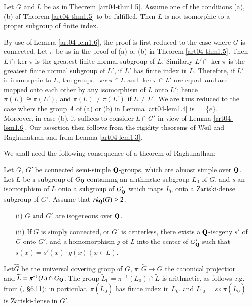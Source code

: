 \begin{proposition}\label{art04-prop1.7}
Let $G$ and $L$ be as in Theorem \ref{art04-thm1.5}. Assume one of the conditions (a), (b) of Theorem \ref{art04-thm1.5} to be fulfilled. Then $L$ is not isomorphic to a proper subgroup of finite index.
\end{proposition}

By use of Lemma \ref{art04-lem1.6}, the proof is first reduced to the case where $G$ is connected. Let $\pi$ be as in the proof of (a) or (b) in Theorem \ref{art04-thm1.5}. Then $L\cap \ker \pi$ is the greatest finite normal subgroup of $L$. Similarly $L'\cap \ker \pi$ is the greatest finite normal subgroup of $L'$, if $L'$ has finite index in $L$. Therefore, if $L'$ is isomorphic to $L$, the groups $\ker \pi \cap L$ and $\ker \pi \cap L'$ are equal, and are mapped onto each other by any isomorphism of $L$ onto $L'$; hence $\pi(L)\cong \pi(L')$, and $\pi(L)\neq \pi(L')$ if $L\neq L'$. We are thus reduced to the case where the group $A$ of (a) or (b) in Lemma \ref{art04-lem1.4} is $=\{e\}$. Moreover, in case (b), it suffices to consider $L\cap G'$ in view of Lemma \ref{art04-lem1.6}. Our assertion then follows from the rigidity theorems of Weil and Raghunathan and from Lemma \ref{art04-lem1.3}.

We shall need the following consequence of a theorem of Raghunathan:

\begin{lemma}\label{art04-lem1.8}
Let $G$, $G'$ be connected semi-simple $\mathbf{Q}$-groups, which are almost simple over $\mathbf{Q}$. Let $L$ be a subgroup of $G_{\mathbf{Q}}$ containing an arithmetic subgroup $L_{0}$ of $G$, and $s$ an isomorphism of $L$ onto a subgroup of $G'_{\mathbf{Q}}$ which maps $L_{0}$ onto a Zariski-dense subgroup of $G'$. Assume that $rk_{\mathbf{Q}}(G)\geq 2$.
\begin{itemize}
\item[{\rm(i)}] $G$ and $G'$ are isogeneous over $\mathbf{Q}$.

\item[{\rm(ii)}] If $G$ is simply connected, or $G'$ is centerless, there exists a $\mathbf{Q}$-isogeny $s'$ of $G$ onto $G'$, and a homomorphism $g$ of $L$ into the center of $G'_{\mathbf{Q}}$ such that $s(x)=s'(x)\cdot g(x)(x\in L)$.
\end{itemize}
\end{lemma}

Let\pageoriginale $\widehat{G}$ be the universal covering group of $G$, $\pi:\widetilde{G}\to G$ the canonical projection and $\widetilde{L}=\pi^{-1}(L)\cap G_{\mathbf{Q}}$. The group $\widetilde{L}_{0}=\pi^{-1}(L_{0})\cap \widetilde{L}$ is arithmetic, as follows e.g. from (\cite{art04-key7}, \S6.11); in particular, $\pi(\widetilde{L}_{0})$ has finite index in $L_{0}$, and $L'_{0}=s\circ \pi(\widetilde{L}_{0})$ is Zariski-dense in $G'$.

